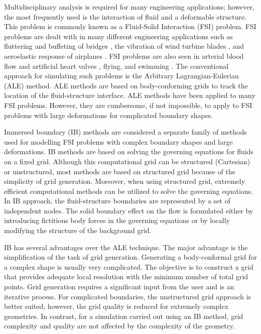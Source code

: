 Multidisciplinary analysis is required for many engineering applications; however, the most frequently used is the interaction of fluid and a deformable structure. This problem is commonly known as a Fluid-Solid Interaction (FSI) problem. FSI problems are dealt with in many different engineering applications such as fluttering and buffeting of bridges \cite{jain1996coupled}, the vibration of wind turbine blades \cite{arrigan2011control}, and aeroelastic response of airplanes \cite{farhat2006provably}. FSI problems are also seen in arterial blood flow and artificial heart valves \cite{sotiropoulos2009review}, flying, and swimming \cite{kern2006simulations}. The conventional approach for simulating such problems is the Arbitrary Lagrangian-Eulerian (ALE) method. ALE methods are based on body-conforming grids to track the location of the fluid-structure interface. ALE methods have been applied to many FSI problems. However, they are cumbersome, if not impossible, to apply to FSI problems with large deformations for complicated boundary shapes.

Immersed boundary (IB) methods are considered a separate family of methods used for modelling FSI problems with complex boundary shapes and large deformations. IB methods are based on solving the governing equations for fluids on a fixed grid. Although this computational grid can be structured (Cartesian) or unstructured, most methods are based on structured grid because of the simplicity of grid generation. Moreover, when using structured grid, extremely efficient computational methods can be utilized to solve the governing equations. In IB approach, the fluid-structure boundaries are represented by a set of independent nodes. The solid boundary effect on the flow is formulated either by introducing fictitious body forces in the governing equations or by locally modifying the structure of the background grid.

IB has several advantages over the ALE technique. The major advantage is the simplification of the task of grid generation. Generating a body-conformal grid for a complex shape is usually very complicated. The objective is to construct a grid that provides adequate local resolution with the minimum number of total grid points. Grid generation requires a significant input from the user and is an iterative process. For complicated boundaries, the unstructured grid approach is better suited; however, the grid quality is reduced for extremely complex geometries. In contrast, for a simulation carried out using an IB method, grid complexity and quality are not affected by the complexity of the geometry. 

